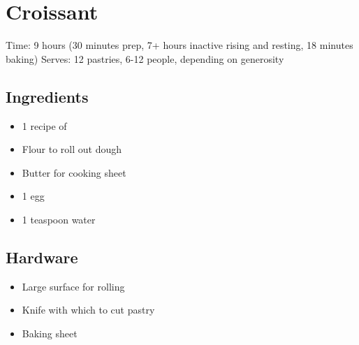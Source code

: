 \section{Croissant}
\label{croissant}
\setcounter{secnumdepth}{0}
Time: 9 hours (30 minutes prep, 7+ hours inactive rising and resting, 18 minutes baking)
Serves: 12 pastries, 6-12 people, depending on generosity

\begin{multicols}{2}
\subsection*{Ingredients}
\begin{itemize}
    \item 1 recipe of 
    \item Flour to roll out dough
    \item Butter for cooking sheet
    \item 1 egg
    \item 1 teaspoon water
\end{itemize}

\subsection*{Hardware}
\begin{itemize}
    \item Large surface for rolling
    \item Knife with which to cut pastry
    \item Baking sheet
\end{itemize}
\clearpage


\end{multicols}
